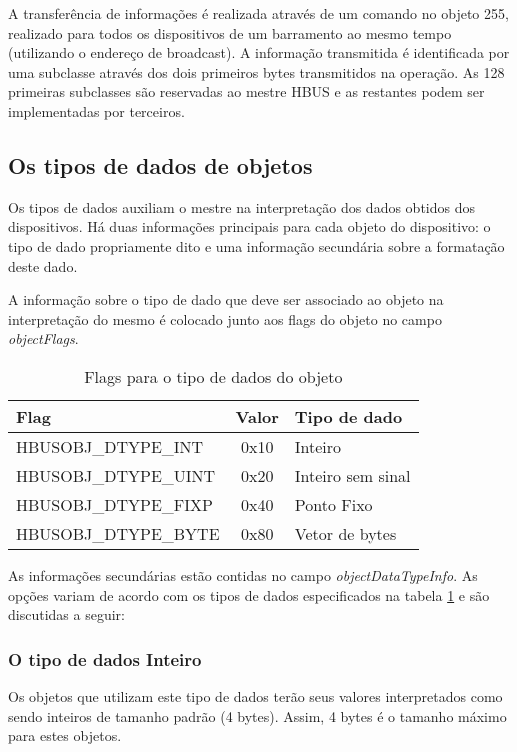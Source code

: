 A transferência de informações é realizada através de um comando  no objeto 255, realizado para todos os dispositivos de um barramento ao mesmo tempo (utilizando o endereço de broadcast). A informação transmitida é identificada por uma subclasse através dos dois primeiros bytes transmitidos na operação. As 128 primeiras subclasses são reservadas ao mestre HBUS e as restantes podem ser implementadas por terceiros.


\subsection{Os tipos de dados de objetos}

Os tipos de dados auxiliam o mestre na interpretação dos dados obtidos dos dispositivos. Há duas informações principais para cada objeto do dispositivo: o tipo de dado propriamente dito e uma informação secundária sobre a formatação deste dado.

A informação sobre o tipo de dado que deve ser associado ao objeto na interpretação do mesmo é colocado junto aos flags do objeto no campo \textit{objectFlags}.

\begin{table}[H]
\centering
\label{table:datatypes}
\caption{Flags para o tipo de dados do objeto}
\begin{tabular}{l c l}
\hline
Flag					&	Valor	& Tipo de dado\\
\hline
HBUSOBJ\_DTYPE\_INT	&	0x10		& Inteiro\\
HBUSOBJ\_DTYPE\_UINT	&	0x20		& Inteiro sem sinal\\
HBUSOBJ\_DTYPE\_FIXP	&	0x40		& Ponto Fixo\\
HBUSOBJ\_DTYPE\_BYTE	&	0x80		& Vetor de bytes\\
\hline
\end{tabular}
\end{table}

As informações secundárias estão contidas no campo \textit{objectDataTypeInfo}. As opções variam de acordo com os tipos de dados especificados na tabela \ref{table:datatypes} e são discutidas a seguir:

\subsubsection*{O tipo de dados Inteiro}

Os objetos que utilizam este tipo de dados terão seus valores interpretados como sendo inteiros de tamanho padrão (4 bytes). Assim, 4 bytes é o tamanho máximo para estes objetos.

